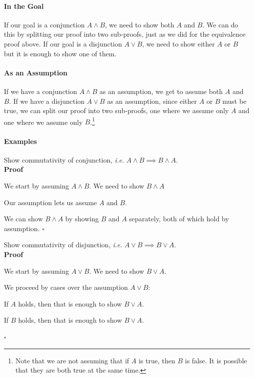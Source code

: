 \documentclass{tufte-handout}
\begin{document}
\paragraph{In the Goal}
If our goal is a conjunction $A \land B$, we need to show both $A$
and $B$. We can do this by splitting our proof into two
sub-proofs, just as we did for the equivalence proof above.
%
If our goal is a disjunction $A \lor B$, we need to show either
$A$ or $B$ but it is enough to show one of them.

\paragraph{As an Assumption}
If we have a conjunction $A \land B$ as an assumption, we get to
assume both $A$ and $B$. If we have a disjunction $A \lor B$ as an
assumption, since either $A$ or $B$ must be true, we can split our
proof into two sub-proofs, one where we assume only $A$ and one
where we assume only $B$.\footnote{Note that we are not assuming
  that if $A$ is true, then $B$ is false. It is possible that they
  are both true at the same time. }


\paragraph{Examples}

\begin{itemize}
\item Show commutativity of conjunction, \emph{i.e.} $A \land B \implies B \land A$.\\
  \textbf{Proof}
  \begin{compactenum}
  \item We start by assuming $A \land B$. We need to show $B \land A$
  \item Our assumption lets us assume $A$ and $B$.
  \item We can show $B \land A$ by showing $B$ and $A$ separately,
    both of which hold by assumption. $\square$
  \end{compactenum}
\item Show commutativity of disjunction, \emph{i.e.} $A \lor B \implies B \lor A$.\\
  \textbf{Proof}
  \begin{compactenum}
  \item We start by assuming $A \lor B$. We need to show $B \lor A$.
  \item We proceed by cases over the assumption $A \lor B$:
    \begin{compactenum}
    \item If $A$ holds, then that is enough to show $B \lor A$.
    \item If $B$ holds, then that is enough to show $B \lor A$.
    \end{compactenum}
  \end{compactenum}
  $\square$
\end{itemize}
\end{document}

